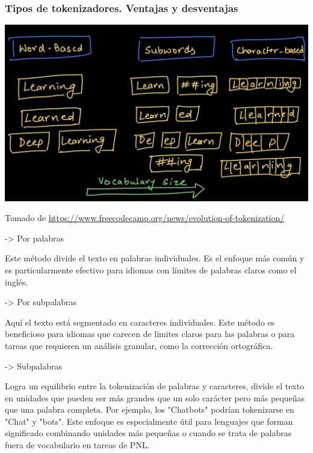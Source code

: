\documentclass[
10pt, %
aspectratio=169, %
]{beamer}
\begin{document}
	
	\begin{frame}
		
		\frametitle{Tipos de tokenizadores. Ventajas y desventajas}
		
		\centering
		\includegraphics[scale=0.34]{tipo-tokenizador.png} 
		
		{\scriptsize Tomado de \url{https://www.freecodecamp.org/news/evolution-of-tokenization/}}
		
		{
			
			-> Por palabras
			
			Este método divide el texto en palabras individuales. Es el enfoque más común y es particularmente efectivo para idiomas con límites de palabras claros como el inglés.
			
			-> Por subpalabras 
			
			Aquí el texto está segmentado en caracteres individuales. Este método es beneficioso para idiomas que carecen de límites claros para las palabras o para tareas que requieren un análisis granular, como la corrección ortográfica.
			
			-> Subpalabras 
			
			Logra un equilibrio entre la tokenización de palabras y caracteres, divide el texto en unidades que pueden ser más grandes que un solo carácter pero más pequeñas que una palabra completa. Por ejemplo, los "Chatbots" podrían tokenizarse en "Chat" y "bots". Este enfoque es especialmente útil para lenguajes que forman significado combinando unidades más pequeñas o cuando se trata de palabras fuera de vocabulario en tareas de PNL.
		}
		
	\end{frame}
	
\end{document}

